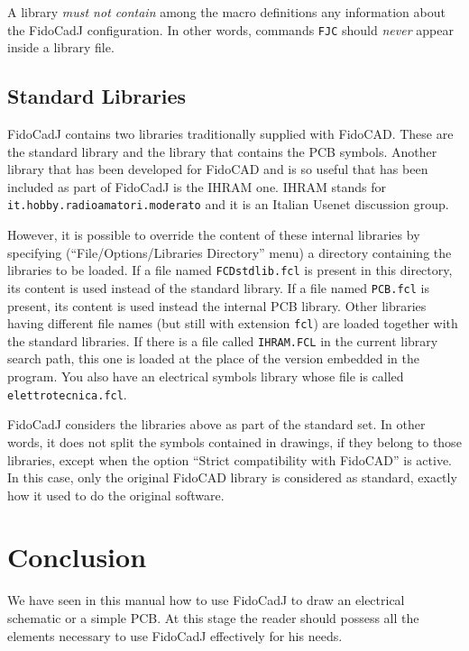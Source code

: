 \documentclass[10pt,a4paper,twoside]{scrreprt}
\begin{document}
A library \textit{must not contain} among the macro definitions any information about the FidoCadJ configuration. In other words, commands \lstinline!FJC! should \textit{never} appear inside a library file.

\section{Standard Libraries}

FidoCadJ contains two libraries traditionally supplied with
FidoCAD. These are the standard library
and the library that contains the PCB symbols. Another library that has been developed for FidoCAD and is so useful that has been included as part of FidoCadJ is the IHRAM one. IHRAM stands for \lstinline!it.hobby.radioamatori.moderato! and it is an Italian Usenet discussion group.

However, it is possible to override the content of these internal
libraries by specifying (``File/Options/Libraries Directory'' menu)
a directory containing the libraries to be loaded. If a file named
\lstinline!FCDstdlib.fcl! is present in this directory, its content is used instead of the standard library. If a file named
\lstinline!PCB.fcl! is present, its content is used instead the internal PCB library. Other libraries having different file
names (but still with extension \lstinline!fcl!) are loaded together
with the standard libraries. If there is a file called \lstinline!IHRAM.FCL! in the current library search path, this one is loaded at the place
of the version embedded in the program. You also have an electrical symbols library whose file is called \lstinline!elettrotecnica.fcl!.

FidoCadJ considers the libraries above as part of the standard set. In other words, it does not split the symbols contained in drawings, if they belong to those libraries, except when the option ``Strict compatibility with FidoCAD'' is active. In this case, only the original FidoCAD library is considered as standard, exactly how it used to do the original software.


\chapter{Conclusion} We have seen in this manual how to use FidoCadJ
to draw an electrical schematic or a simple PCB. At this stage the
reader should possess all the elements necessary to use FidoCadJ effectively
for his needs.
\end{document}
